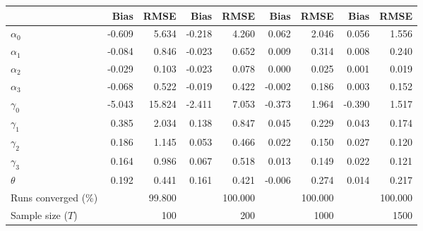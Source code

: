 
\begin{tabular}[t]{lrrrrrrrr}
\toprule
  & Bias & RMSE & Bias & RMSE & Bias & RMSE & Bias & RMSE\\
\midrule
$\alpha_{0}$ & -0.609 & 5.634 & -0.218 & 4.260 & 0.062 & 2.046 & 0.056 & 1.556\\
$\alpha_{1}$ & -0.084 & 0.846 & -0.023 & 0.652 & 0.009 & 0.314 & 0.008 & 0.240\\
$\alpha_{2}$ & -0.029 & 0.103 & -0.023 & 0.078 & 0.000 & 0.025 & 0.001 & 0.019\\
$\alpha_{3}$ & -0.068 & 0.522 & -0.019 & 0.422 & -0.002 & 0.186 & 0.003 & 0.152\\
$\gamma_{0}$ & -5.043 & 15.824 & -2.411 & 7.053 & -0.373 & 1.964 & -0.390 & 1.517\\
$\gamma_{1}$ & 0.385 & 2.034 & 0.138 & 0.847 & 0.045 & 0.229 & 0.043 & 0.174\\
$\gamma_{2}$ & 0.186 & 1.145 & 0.053 & 0.466 & 0.022 & 0.150 & 0.027 & 0.120\\
$\gamma_{3}$ & 0.164 & 0.986 & 0.067 & 0.518 & 0.013 & 0.149 & 0.022 & 0.121\\
$\theta$ & 0.192 & 0.441 & 0.161 & 0.421 & -0.006 & 0.274 & 0.014 & 0.217\\
Runs converged (\%) &  & 99.800 &  & 100.000 &  & 100.000 &  & 100.000\\
Sample size ($T$) &  & 100 &  & 200 &  & 1000 &  & 1500\\
\bottomrule
\end{tabular}
